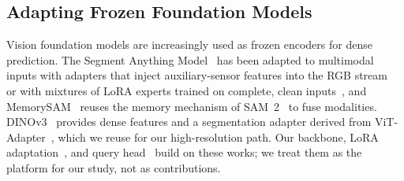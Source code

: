 \subsection{Adapting Frozen Foundation Models}
Vision foundation models are increasingly used as frozen encoders for dense prediction. The Segment Anything Model~\cite{sam2023} has been adapted to multimodal inputs with adapters that inject auxiliary-sensor features into the RGB stream~\cite{mmsamadapter2025} or with mixtures of LoRA experts trained on complete, clean inputs~\cite{mlesam}, and MemorySAM~\cite{memorysam2025} reuses the memory mechanism of SAM~2~\cite{sam2_2024} to fuse modalities. DINOv3~\cite{dinov3_2025} provides dense features and a segmentation adapter derived from ViT-Adapter~\cite{vitadapter2023}, which we reuse for our high-resolution path. Our backbone, LoRA adaptation~\cite{lora2022}, and query head~\cite{mask2former2022} build on these works; we treat them as the platform for our study, not as contributions.
